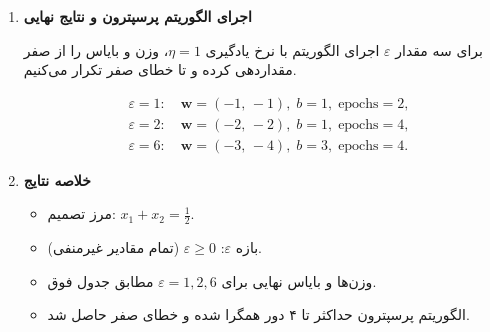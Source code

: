 \begin{enumerate}
\begin{enumerate}
		\item 
		\textbf{اجرای الگوریتم پرسپترون و نتایج نهایی}
		
		برای سه مقدار \(\varepsilon\) اجرای الگوریتم با نرخ یادگیری \(\eta=1\)، وزن و بایاس را از صفر مقداردهی کرده و تا خطای صفر تکرار می‌کنیم.
		
		

		
		{\small
			\[
			\begin{aligned}
				&\varepsilon=1:\quad \mathbf{w}=(-1,\,-1),\; b=1,\;\text{epochs}=2,\\
				&\varepsilon=2:\quad \mathbf{w}=(-2,\,-2),\; b=1,\;\text{epochs}=4,\\
				&\varepsilon=6:\quad \mathbf{w}=(-3,\,-4),\; b=3,\;\text{epochs}=4.
			\end{aligned}
			\]}
		
		\item 
		\textbf{خلاصه نتایج}
		
		\begin{itemize}
			\item مرز تصمیم: \(x_1 + x_2 = \frac{1}{2}\).
			\item بازه \(\varepsilon\): \(\varepsilon \ge 0\) (تمام مقادیر غیرمنفی).
			\item وزن‌ها و بایاس نهایی برای \(\varepsilon=1,2,6\) مطابق جدول فوق.
			\item الگوریتم پرسپترون حداکثر تا ۴ دور همگرا شده و خطای صفر حاصل شد.
		\end{itemize}
		
	\end{enumerate}





\end{enumerate}
